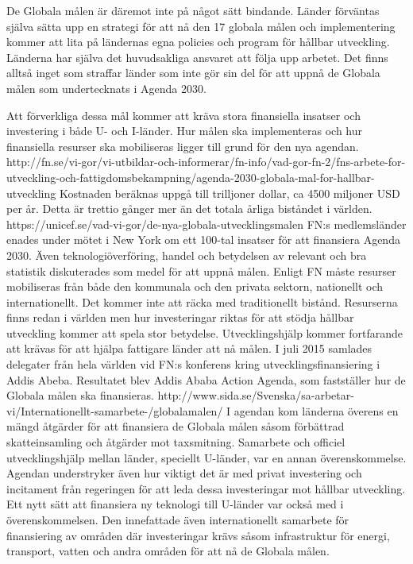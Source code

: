 \documentclass{report}
\begin{document}
De Globala målen är däremot inte på något sätt bindande. Länder förväntas själva sätta upp en strategi för att nå den 17 globala målen och implementering kommer att lita på ländernas egna policies och program för hållbar utveckling. Länderna har själva det huvudsakliga ansvaret att följa upp arbetet. Det finns alltså inget som straffar länder som inte gör sin del för att uppnå de Globala målen som undertecknats i Agenda 2030. \cite{web2030agenda}

Att förverkliga dessa mål kommer att kräva stora finansiella insatser och  investering i både U- och I-länder. \cite{web2030agenda}
Hur målen ska implementeras och hur finansiella resurser ska mobiliseras ligger till grund för den nya agendan. http://fn.se/vi-gor/vi-utbildar-och-informerar/fn-info/vad-gor-fn-2/fns-arbete-for-utveckling-och-fattigdomsbekampning/agenda-2030-globala-mal-for-hallbar-utveckling 
Kostnaden beräknas uppgå till trilljoner dollar, \cite{web2030agenda} ca 4500 miljoner USD per år. Detta är trettio gånger mer än det totala årliga biståndet i världen.  https://unicef.se/vad-vi-gor/de-nya-globala-utvecklingsmalen FN:s medlemsländer enades under mötet i New York om ett 100-tal insatser för att finansiera Agenda 2030. Även teknologiöverföring, handel och betydelsen av relevant och bra statistik diskuterades som medel för att uppnå målen. \cite{webUNASweden}
Enligt FN måste resurser mobiliseras från både den kommunala och den privata sektorn, nationellt och internationellt. Det kommer inte att räcka med traditionellt bistånd. Resurserna finns redan i världen men hur investeringar riktas för att stödja hållbar utveckling kommer att spela stor betydelse. Utvecklingshjälp kommer fortfarande att krävas för att hjälpa fattigare länder att nå målen. 
\cite{web2030agenda}
I juli 2015 samlades delegater från hela världen vid FN:s konferens kring utvecklingsfinansiering i Addis Abeba. Resultatet blev Addis Ababa Action Agenda, som fastställer hur de Globala målen ska finansieras.  http://www.sida.se/Svenska/sa-arbetar-vi/Internationellt-samarbete-/globalamalen/
I agendan kom länderna överens en mängd åtgärder för att finansiera de Globala målen såsom förbättrad skatteinsamling och åtgärder mot taxsmitning. Samarbete och officiel utvecklingshjälp mellan länder, speciellt U-länder, var en annan överenskommelse. Agendan understryker även hur viktigt det är med privat investering och incitament från regeringen för att leda dessa investeringar mot hållbar utveckling. Ett nytt sätt att finansiera ny teknologi till U-länder var också med i överenskommelsen. Den innefattade även internationellt samarbete för finansiering av områden där investeringar krävs såsom infrastruktur för energi, transport, vatten och andra områden för att nå de Globala målen.  
\cite{webUNDESA}
\end{document}
